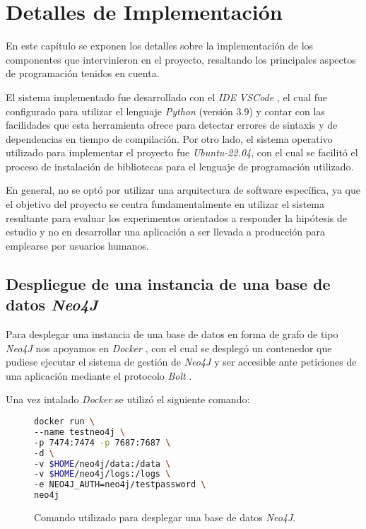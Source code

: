\chapter{Detalles de Implementación}\label{chapter: implementation}

En este capítulo se exponen los detalles sobre la implementación de los componentes que intervinieron en el proyecto, resaltando los principales aspectos de programación tenidos en cuenta.

El sistema implementado fue desarrollado con el \textit{IDE} \textit{VSCode} \cite{vscode}, el cual fue configurado para utilizar el lenguaje \textit{Python} (versión 3.9) \cite{python} y contar con las facilidades que esta herramienta ofrece para detectar errores de sintaxis y de dependencias en tiempo de compilación. Por otro lado, el sistema operativo utilizado para implementar el proyecto fue \textit{Ubuntu-22.04}, con el cual se facilitó el proceso de instalación de bibliotecas para el lenguaje de programación utilizado.

En general, no se optó por utilizar una arquitectura de software específica, ya que el objetivo del proyecto se centra fundamentalmente en utilizar el sistema resultante para evaluar los experimentos orientados a responder la hipótesis de estudio y no en desarrollar una aplicación a ser llevada a producción para emplearse por usuarios humanos.

\section{Despliegue de una instancia de una base de datos \textit{Neo4J}}

Para desplegar una instancia de una base de datos en forma de grafo de tipo \textit{Neo4J} nos apoyamos en \textit{Docker} \cite{docker}, con el cual se desplegó un contenedor que pudiese ejecutar el sistema de gestión de \textit{Neo4J} y ser accesible ante peticiones de una aplicación mediante el protocolo \textit{Bolt} \cite{boltprotocol}.

Una vez intalado \textit{Docker} se utilizó el siguiente comando:

\begin{figure}[h]
\begin{lstlisting}[language=bash]
 docker run \
--name testneo4j \
-p 7474:7474 -p 7687:7687 \
-d \
-v $HOME/neo4j/data:/data \
-v $HOME/neo4j/logs:/logs \
-e NEO4J_AUTH=neo4j/testpassword \
neo4j
\end{lstlisting}
\caption{Comando utilizado para desplegar una base de datos \textit{Neo4J}.}
\end{figure}


